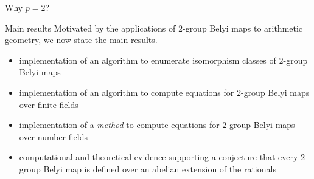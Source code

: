 \documentclass[xcolor=dvipsnames]{beamer}
\theoremstyle{plain}
\begin{document}
{\begin{frame}{Why $p=2$?}
    \end{frame}
    \begin{frame}{Main results}
      Motivated by the applications of
      $2$-group Belyi maps to arithmetic geometry,
      we now state the main results.
      \pause
      \begin{itemize}
        \item
          implementation of an algorithm to
          enumerate isomorphism classes
          of $2$-group Belyi maps
          \pause
        \item
          implementation of an algorithm to
          compute equations for
          $2$-group Belyi maps
          over finite fields
          \pause
        \item
          implementation of a \emph{method}
          to compute equations for
          $2$-group Belyi maps
          over number fields
          \pause
        \item
          computational and theoretical evidence
          supporting a conjecture that
          every $2$-group Belyi map
          is defined over an
          abelian extension of the rationals
      \end{itemize}
    \end{frame}
  }
\end{document}
